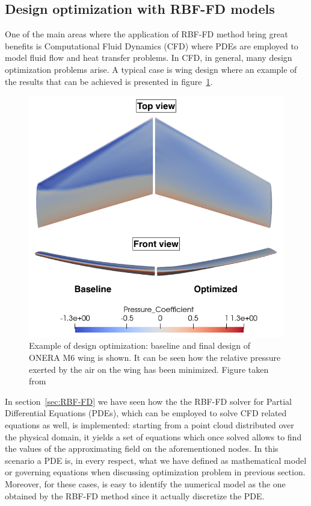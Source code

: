 
\subsection{Design optimization with RBF-FD models}

One of the main areas where the application of RBF-FD method bring great benefits is Computational Fluid Dynamics (CFD) where PDEs are employed to model fluid flow and heat transfer problems. In CFD, in general, many design optimization problems arise. A typical case is wing design where an example of the results that can be achieved is presented in figure~\ref{fig:wing_opt_new}.

\begin{figure}
	\centering
	\includegraphics[width=.5\textwidth]{img/wing_opt.png}
	\caption{Example of design optimization: baseline and final design of ONERA M6 wing is shown. It can be seen how the relative pressure exerted by the air on the wing has been minimized. Figure taken from~\cite{Bombardieri:paper_of_wing_opt_image}}
	\label{fig:wing_opt_new}
\end{figure}

In section~\vref{sec:RBF-FD} we have seen how the the RBF-FD solver for Partial Differential Equations (PDEs), which can be employed to solve CFD related equations as well, is implemented: starting from a point cloud distributed over the physical domain, it yields a set of equations which once solved allows to find the values of the approximating field on the aforementioned nodes.
In this scenario a PDE is, in every respect, what we have defined as mathematical model or governing equations when discussing optimization problem in previous section. Moreover, for these cases, is easy to identify the numerical model as the one obtained by the RBF-FD method since it actually discretize the PDE.

